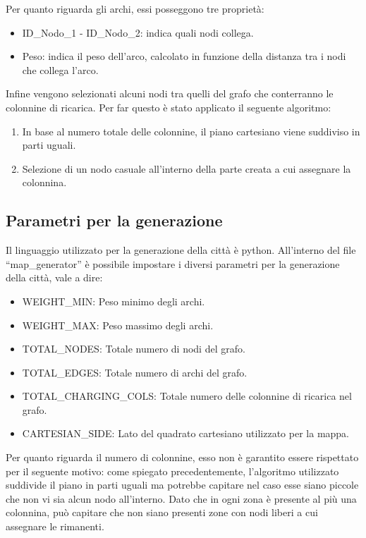 Per quanto riguarda gli archi, essi posseggono tre proprietà:
\begin{itemize}
	\item ID\_Nodo\_1 - ID\_Nodo\_2: indica quali nodi collega.
	\item Peso: indica il peso dell'arco, calcolato in funzione della distanza tra i nodi che collega l'arco.
\end{itemize}

Infine vengono selezionati alcuni nodi tra quelli del grafo che conterranno le colonnine di ricarica. Per far questo è stato applicato il seguente algoritmo:
\begin{enumerate}
	\item In base al numero totale delle colonnine, il piano cartesiano viene suddiviso in parti uguali.
	\item Selezione di un nodo casuale all'interno della parte creata a cui assegnare la colonnina.
\end{enumerate}

\subsection{Parametri per la generazione}
Il linguaggio utilizzato per la generazione della città è python. All'interno del file ``map\_generator'' è possibile impostare i diversi parametri per la generazione della città, vale a dire:
\begin{itemize}
	\item WEIGHT\_MIN: Peso minimo degli archi.
	\item WEIGHT\_MAX:  Peso massimo degli archi.
	\item TOTAL\_NODES: Totale numero di nodi del grafo.
	\item TOTAL\_EDGES:  Totale numero di archi del grafo.
	\item TOTAL\_CHARGING\_COLS:  Totale numero delle colonnine di ricarica nel grafo.
	\item CARTESIAN\_SIDE:  Lato del quadrato cartesiano utilizzato per la mappa.
\end{itemize}

Per quanto riguarda il numero di colonnine, esso non è garantito essere rispettato per il seguente motivo: come spiegato precedentemente, l'algoritmo utilizzato suddivide il piano in parti uguali ma potrebbe capitare nel caso esse siano piccole che non vi sia alcun nodo all'interno. Dato che in ogni zona è presente al più una colonnina, può capitare che non siano presenti zone con nodi liberi a cui assegnare le rimanenti.

